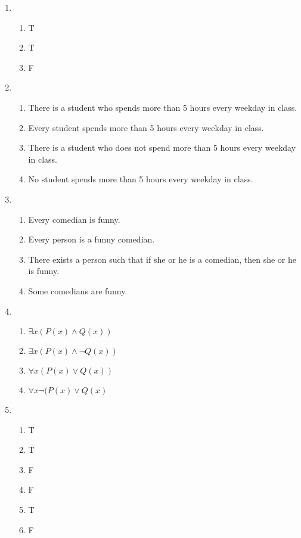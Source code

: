 \documentclass{sig-alternate-05-2015}
\begin{document}
\begin{enumerate}
\item 
\begin{enumerate}
	\item T
	\item T
	\item F
\end{enumerate}

\item 
\begin{enumerate}
	\item There
	is a student who spends more than 5 hours every weekday
	in class.
	\item Every student spends more than 5 hours every
	weekday in class.
	\item There is a student who does not
	spend more than 5 hours every weekday in class.
	\item No
	student spends more than 5 hours every weekday in class.
\end{enumerate}

\item 
\begin{enumerate}
	\item Every comedian is funny.
	\item Every person is a funny
	comedian.
	\item There exists a person such that if she or he is
	a comedian, then she or he is funny.
	\item Some comedians
	are funny.
\end{enumerate}

\item 
\begin{enumerate}
	\item $\exists x (P(x) \wedge Q(x))$
	\item $\exists x (P(x) \wedge \neg Q(x))$
	\item $\forall x (P(x) \vee Q(x))$
	\item $\forall x \neg (P(x) \vee Q(x)$
\end{enumerate}

\item 
\begin{enumerate}
	\item T
	\item T
	\item F
	\item F
	\item T
	\item F
\end{enumerate}


\end{enumerate}
\end{document}
